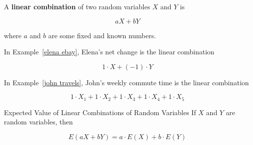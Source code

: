 \documentclass{beamer}
\begin{document}
\begin{frame}
\begin{definition}
A \textbf{linear combination} of two random variables $X$ and $Y$ is

\vspace{-3mm}
\begin{equation*}
aX+bY
\end{equation*}

\vspace{-2mm}
where $a$ and $b$ are some fixed and known numbers.
\end{definition}\pause

\begin{example}
In Example~\ref{elena ebay}, Elena's net change is the linear combination

\vspace{-3mm}
\begin{equation*}
1\cdot X + (-1)\cdot Y
\end{equation*}
\end{example}\pause

\begin{example}
In Example~\ref{john travels}, John's weekly commute time is the linear combination 

\vspace{-3mm}
\begin{equation*}
1\cdot X_1+1\cdot X_2+1\cdot X_3+1\cdot X_4+1\cdot X_5
\end{equation*}
\end{example}\pause

\begin{block}{Expected Value of Linear Combinations of Random Variables}
If $X$ and $Y$ are random variables, then

\vspace{-3mm}
\begin{equation*}
E(aX+bY) = a\cdot E(X) + b\cdot E(Y)
\end{equation*}
\end{block}
\end{frame}
\end{document}
